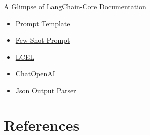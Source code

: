 \documentclass[11.5pt]{beamer}
\begin{document}
\begin{frame}{A Glimpse of LangChain-Core Documentation}
\begin{itemize}
    \item \href{https://python.langchain.com/docs/modules/model_io/prompts/quick_start}{Prompt Template}
    \item \href{https://python.langchain.com/docs/modules/model_io/prompts/few_shot_examples_chat}{Few-Shot Prompt}
    \item \href{https://python.langchain.com/docs/expression_language/why}{LCEL}
    \item \href{https://python.langchain.com/docs/integrations/chat/openai}{ChatOpenAI}
    \item \href{https://python.langchain.com/docs/modules/model_io/output_parsers/types/json}{Json Output Parser}
\end{itemize}
\end{frame}

\section{References}
\begin{frame}[allowframebreaks]{}
\renewcommand{\section}[2]{}%

\end{frame}
\end{document}
